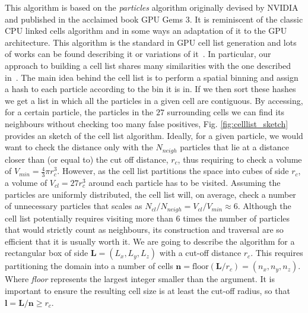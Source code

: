 \documentclass[ twoside,openright,titlepage,numbers=noenddot,%
headinclude,footinclude,cleardoublepage=empty,abstract=on,
BCOR=5mm,paper=b5,fontsize=11pt, dvipsnames
]{scrreprt}
\renewcommand{\vec}[1]{\bm{#1}}
\newcommand{\gpu}{\gls{GPU}\xspace}
\begin{document}
This algorithm is based on the \emph{particles} algorithm originally devised by NVIDIA and published in the acclaimed book GPU Gems 3\cite{Nguyen2008}. It is reminiscent of the classic CPU linked cells algorithm\cite{Allen2017} and in some ways an adaptation of it to the \gpu architecture. This algorithm is the standard in \gls{GPU} cell list generation and lots of works can be found describing it or variations of it~\cite{Anderson2008}\cite{Dominguez2011}\cite{Howard2016}\cite{Brown2011}. In particular, our approach to building a cell list shares many similarities with the one described in~\cite{Tang2014}.
The main idea behind the cell list is to perform a spatial binning and assign a hash to each particle according to the bin it is in. If we then sort these hashes we get a list in which all the particles in a given cell are contiguous. By accessing, for a certain particle, the particles in the $27$ surrounding cells we can find its neighbours without checking too many false positives, Fig. \ref{fig:celllist_sketch} provides an sketch of the cell list algorithm. Ideally, for a given particle, we would want to check the distance only with the $N_{neigh}$ particles that lie at a distance closer than (or equal to) the cut off distance, $r_{c}$, thus requiring to check a volume of $V_{min}=\frac{4}{3}\pi r_{c}^3$. However, as the cell list partitions the space into cubes of side $r_{c}$, a volume of $V_{cl} = 27r_{c}^3$ around each particle has to be visited.
Assuming the particles are uniformly distributed, the cell list will, on average, check a number of unnecessary particles that scales as $N_{cl}/N_{neigh} = V_{cl}/V_{min} \approx 6$. Although the cell list potentially requires visiting more than $6$ times the number of particles that would strictly count as neighbours, its construction and traversal are so efficient that it is usually worth it.
We are going to describe the algorithm for a rectangular box of side $\vec{L}=(L_x, L_y, L_z)$ with a cut-off distance $r_{c}$. This requires partitioning the domain into a number of cells $\vec{n}=\textrm{floor}(\vec{L}/r_{c}) = (n_x, n_y, n_z)$. Where \emph{floor} represents the largest integer smaller than the argument. It is important to ensure the resulting cell size is at least the cut-off radius, so that $\vec{l} = \vec{L}/\vec{n} \ge r_{c}$.
\end{document}
